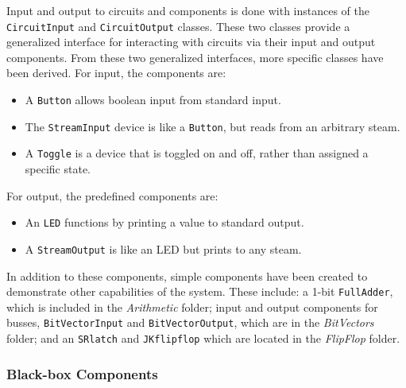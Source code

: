 \documentclass{article}
\newcommand{\Italics}[1]{\textit{#1}}
\newcommand{\ClassName}[1]{\texttt{#1}}
\begin{document}
Input and output to circuits and components is done with instances of the \ClassName{CircuitInput} and \ClassName{CircuitOutput} classes. These two classes provide a generalized interface for interacting with circuits via their input and output components. From these two generalized interfaces, more specific classes have been derived. For input, the components are:

\begin{itemize}

\item A \ClassName{Button} allows boolean input from standard input.

\item The \ClassName{StreamInput} device is like a \ClassName{Button}, but reads from an arbitrary steam.

\item A \ClassName{Toggle} is a device that is toggled on and off, rather than assigned a specific state.

\end{itemize}

For output, the predefined components are:

\begin{itemize}

\item An \ClassName{LED} functions by printing a value to standard output.

\item A \ClassName{StreamOutput} is like an LED but prints to any steam.

\end{itemize}

In addition to these components, simple components have been created to demonstrate other capabilities of the system. These include: a 1-bit \ClassName{FullAdder}, which is included in the \Italics{Arithmetic} folder; input and output components for busses, \ClassName{BitVectorInput} and \ClassName{BitVectorOutput}, which are in the \Italics{BitVectors} folder; and an \ClassName{SRlatch} and \ClassName{JKflipflop} which are located in the \Italics{FlipFlop} folder.

\subsubsection{Black-box Components}
\end{document}
